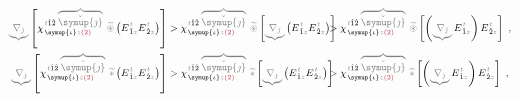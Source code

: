 \begin{subequations}
	\small
\begin{align}
	\mathcolor{gray}{\underbrace{\nabla_{\check{\jmath}}}} \left[ \chi^{\;\! \mathcolor{gray}{t} \hat{1} \hat{2} \;\! \mathcolor{gray}{\overbrace{\check{\symup{\jmath}}}}}_{\;\! \symup{\iota} \mathcolor{gray}{z} \textcolor{Maroon}{(2)}} ~\mathcolor{gray}{\widetilde \circledast} \left( E^{\;\!\mathcolor{gray}{t}}_{\;\! \hat{1} \mathcolor{gray}{z}} E^{\;\!\mathcolor{gray}{t}}_{\;\! \hat{2} \mathcolor{gray}{z}} \right) \right] &> \chi^{\;\! \mathcolor{gray}{t} \hat{1} \hat{2} \;\! \mathcolor{gray}{\overbrace{\check{\symup{\jmath}}}}}_{\;\! \symup{\iota} \mathcolor{gray}{z} \textcolor{Maroon}{(2)}} ~\mathcolor{gray}{\widetilde \circledast} \left[ \mathcolor{gray}{\underbrace{\nabla_{\check{\jmath}}}} \left( E^{\;\!\mathcolor{gray}{t}}_{\;\! \hat{1} \mathcolor{gray}{z}} E^{\;\!\mathcolor{gray}{t}}_{\;\! \hat{2} \mathcolor{gray}{z}} \right) \right] \hspace{-2em}&&> \chi^{\;\! \mathcolor{gray}{t} \hat{1} \hat{2} \;\! \mathcolor{gray}{\overbrace{\check{\symup{\jmath}}}}}_{\;\! \symup{\iota} \mathcolor{gray}{z} \textcolor{Maroon}{(2)}} ~\mathcolor{gray}{\widetilde \circledast} \left[ \left( \mathcolor{gray}{\underbrace{\nabla_{\check{\jmath}}}} E^{\;\!\mathcolor{gray}{t}}_{\;\! \hat{1} \mathcolor{gray}{z}} \right) E^{\;\!\mathcolor{gray}{t}}_{\;\! \hat{2} \mathcolor{gray}{z}} \right]~, \label{eq:Volterra} \\
	\mathcolor{gray}{\underbrace{\nabla_{\check{\jmath}}}} \left[ \chi^{\;\! \mathcolor{gray}{t} \hat{1} \hat{2} \;\! \mathcolor{gray}{\overbrace{\check{\symup{\jmath}}}}}_{\;\! \symup{\iota} \mathcolor{gray}{z} \textcolor{Maroon}{(2)}} ~\mathcolor{gray}{\widetilde *} \left( E^{\;\!\mathcolor{gray}{t}}_{\;\! \hat{1} \mathcolor{gray}{z}} E^{\;\!\mathcolor{gray}{t}}_{\;\! \hat{2} \mathcolor{gray}{z}} \right) \right] &> \chi^{\;\! \mathcolor{gray}{t} \hat{1} \hat{2} \;\! \mathcolor{gray}{\overbrace{\check{\symup{\jmath}}}}}_{\;\! \symup{\iota} \mathcolor{gray}{z} \textcolor{Maroon}{(2)}} ~\mathcolor{gray}{\widetilde *} \left[ \mathcolor{gray}{\underbrace{\nabla_{\check{\jmath}}}} \left( E^{\;\!\mathcolor{gray}{t}}_{\;\! \hat{1} \mathcolor{gray}{z}} E^{\;\!\mathcolor{gray}{t}}_{\;\! \hat{2} \mathcolor{gray}{z}} \right) \right] \hspace{-2em}&&> \chi^{\;\! \mathcolor{gray}{t} \hat{1} \hat{2} \;\! \mathcolor{gray}{\overbrace{\check{\symup{\jmath}}}}}_{\;\! \symup{\iota} \mathcolor{gray}{z} \textcolor{Maroon}{(2)}} ~\mathcolor{gray}{\widetilde *} \left[ \left( \mathcolor{gray}{\underbrace{\nabla_{\check{\jmath}}}} E^{\;\!\mathcolor{gray}{t}}_{\;\! \hat{1} \mathcolor{gray}{z}} \right) E^{\;\!\mathcolor{gray}{t}}_{\;\! \hat{2} \mathcolor{gray}{z}} \right]~, \label{eq:Volterra-time} \\

\end{align}
\end{subequations}
